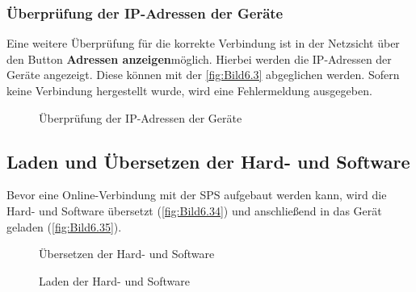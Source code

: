 \subsubsection{Überprüfung der IP-Adressen der Geräte}
Eine weitere Überprüfung für die korrekte Verbindung ist in der Netzsicht über den Button \glqq\textbf{Adressen anzeigen}\grqq\:möglich. Hierbei werden die IP-Adressen der Geräte angezeigt. Diese können mit der \autoref{fig:Bild6.3} abgeglichen werden. Sofern keine Verbindung hergestellt wurde, wird eine Fehlermeldung ausgegeben.

\begin{figure}[H]
   \centering
   \caption[Überprüfung der IP-Adressen der Geräte]{Überprüfung der IP-Adressen der Geräte}
   \label{fig:Bild6.33}
\end{figure}

\clearpage

\subsection{Laden und Übersetzen der Hard- und Software} \label{sec: laden_und_uebersetzen}

Bevor eine Online-Verbindung mit der SPS aufgebaut werden kann, wird die Hard- und Software übersetzt (\autoref{fig:Bild6.34}) und anschließend in das Gerät geladen (\autoref{fig:Bild6.35}).

\begin{figure}[H]
   \centering
   \caption[Übersetzen der Hard- und Software]{Übersetzen der Hard- und Software}
   \label{fig:Bild6.34}
\end{figure}

\begin{figure}[H]
   \centering
   \caption[Laden der Hard- und Software]{Laden der Hard- und Software}
   \label{fig:Bild6.35}
\end{figure}

